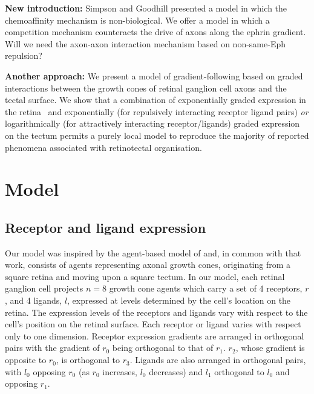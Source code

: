 \documentclass[11pt, a4paper]{article}
\begin{document}
\textbf{New introduction:} Simpson and Goodhill presented a model in which the
chemoaffinity mechanism is non-biological. We offer a model in which a
competition mechanism counteracts the drive of axons along the ephrin
gradient. Will we need the axon-axon interaction mechanism based on
non-same-Eph repulsion?

\textbf{Another approach:} We present a model of gradient-following based on graded
interactions between the growth cones of retinal ganglion cell axons and the
tectal surface. We show that a combination of exponentially graded expression
in the retina~\cite{reber_relative_2004} and exponentially (for repulsively
interacting receptor ligand pairs) \emph{or} logarithmically (for attractively
interacting receptor/ligands) graded expression on the tectum permits a purely
local model to reproduce the majority of reported phenomena associated with
retinotectal organisation.

\section{Model}

\subsection{Receptor and ligand expression}

Our model was inspired by the agent-based model of \cite{simpson_simple_2011}
and, in common with that work, consists of agents representing axonal growth
cones, originating from a square retina and moving upon a square tectum. In
our model, each retinal ganglion cell projects $n=8$ growth cone agents which
carry a set of 4 receptors, $r$, and 4 ligands, $l$, expressed at levels
determined by the cell's location on the retina. The expression levels of the
receptors and ligands vary with respect to the cell's position on the retinal
surface. Each receptor or ligand varies with respect only to one dimension.
Receptor expression gradients are arranged in orthogonal pairs with the
gradient of $r_0$ being orthogonal to that of $r_1$. $r_2$, whose gradient is
opposite to $r_0$, is orthogonal to $r_3$. Ligands are also arranged in
orthogonal pairs, with $l_0$ opposing $r_0$ (as $r_0$ increases, $l_0$
decreases) and $l_1$ orthogonal to $l_0$ and opposing $r_1$.
\end{document}
